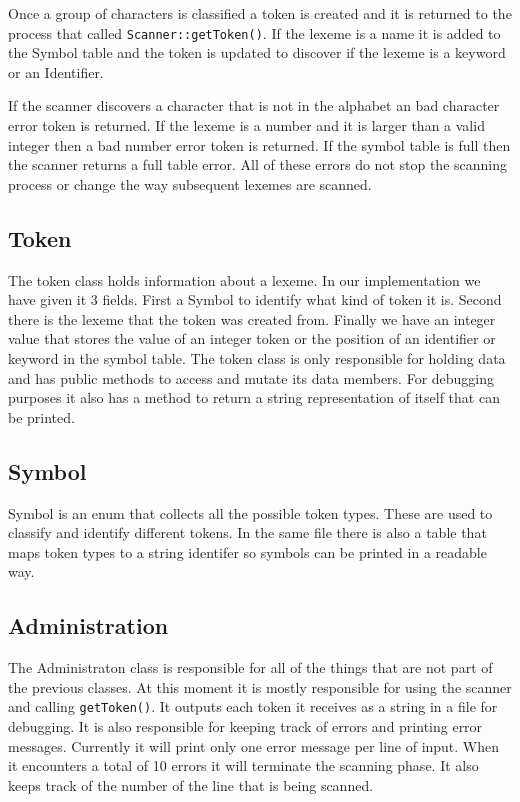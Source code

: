 \documentclass{article}
\begin{document}
Once a group of characters is classified a token is created and it is returned
to the process that called \verb|Scanner::getToken()|. If the lexeme is a name
it is added to the Symbol table and the token is updated to discover if the
lexeme is a keyword or an Identifier.

If the scanner discovers a character that is not in the alphabet an bad character
error token is returned. If the lexeme is a number and it is larger than a
valid integer then a bad number error token is returned. If the symbol table
is full then the scanner returns a full table error. All of these errors do not
stop the scanning process or change the way subsequent lexemes are scanned.

\subsection{Token}
The token class holds information about a lexeme. In our implementation we have
given it 3 fields. First a Symbol to identify what kind of token it is. Second
there is the lexeme that the token was created from. Finally we have an integer
value that stores the value of an integer token or the position of an identifier
or keyword in the symbol table. The token class is only responsible for holding
data and has public methods to access and mutate its data members. For debugging
purposes it also has a method to return a string representation of itself that
can be printed.

\subsection{Symbol}
Symbol is an enum that collects all the possible token types. These are used to
classify and identify different tokens. In the same file there is also a table
that maps token types to a string identifer so symbols can be printed in a
readable way.

\subsection{Administration}
The Administraton class is responsible for all of the things that are not part
of the previous classes. At this moment it is mostly responsible for using
the scanner and calling \verb|getToken()|. It outputs each token it receives as
a string in a file for debugging. It is also responsible for keeping track of
errors and printing error messages. Currently it will print only one error message
per line of input. When it encounters a total of 10 errors it will terminate
the scanning phase. It also keeps track of the number of the line that is being scanned.
\end{document}
